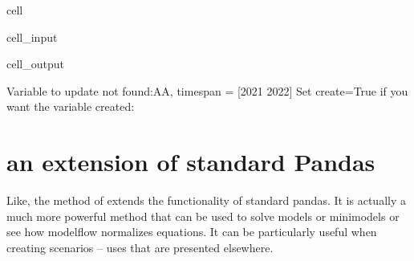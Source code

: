 \documentclass[letterpaper,10pt,english]{jupyterBook}
\begin{document}
\begin{sphinxuseclass}{cell}\begin{sphinxVerbatimInput}

\begin{sphinxuseclass}{cell_input}
\begin{sphinxVerbatim}[commandchars=\\\{\}]
      
   
      
\end{sphinxVerbatim}

\end{sphinxuseclass}\end{sphinxVerbatimInput}
\begin{sphinxVerbatimOutput}

\begin{sphinxuseclass}{cell_output}
\begin{sphinxVerbatim}[commandchars=\\\{\}]
Variable to update not found:AA, timespan = [2021 2022] 
Set create=True if you want the variable created: 
\end{sphinxVerbatim}

\end{sphinxuseclass}\end{sphinxVerbatimOutput}

\end{sphinxuseclass}
\sphinxstepscope


\section{ an extension of standard Pandas}
\label{\detokenize{content/04_PythonEssentials/mfcalc:mfcalc-an-extension-of-standard-pandas}}\label{\detokenize{content/04_PythonEssentials/mfcalc::doc}}
\sphinxAtStartPar
Like, the  method of  extends the functionality of standard pandas.  It is actually a much more powerful method that can be used to solve models or mini\sphinxhyphen{}models or see how modelflow normalizes equations.  It can be particularly useful when creating scenarios – uses that are presented elsewhere.
\end{document}
